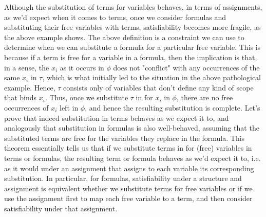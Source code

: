 \documentclass{article}
\begin{document}
Although the substitution of terms for variables behaves, in terms of assignments, as we'd expect when it comes to terms, once we consider formulas and substituting their free variables with terms, satisfiability becomes more fragile, as the above example shows. The above definition is a constraint we can use to determine when we can substitute a formula for a particular free variable. This is because if a term is free for a variable in a formula, then the implication is that, in a sense, the $ x_i $ as it occurs in $ \phi $ does not "conflict" with any occurrences of the same $ x_i $ in $ \tau $, which is what initially led to the situation in the above pathological example. Hence, $ \tau $ consists only of variables that don't define any kind of scope that binds $ x_i $. Thus, once we substitute $ \tau $ in for $ x_i $ in $ \phi $, there are no free occurrences of $ x_i $ left in $ \phi $, and hence the resulting substitution is complete. Let's prove that indeed substitution in terms behaves as we expect it to, and analogously that substitution in formulas is also well-behaved, assuming that the substituted terms are free for the variables they replace in the formula.
This theorem essentially tells us that if we substitute terms in for (free) variables in terms or formulas, the resulting term or formula behaves as we'd expect it to, i.e. as it would under an assignment that assigns to each variable its corresponding substitution. In particular, for formulas, satisfiability under a structure and assignment is equivalent whether we substitute terms for free variables or if we use the assignment first to map each free variable to a term, and then consider satisfiability under that assignment.
\end{document}
